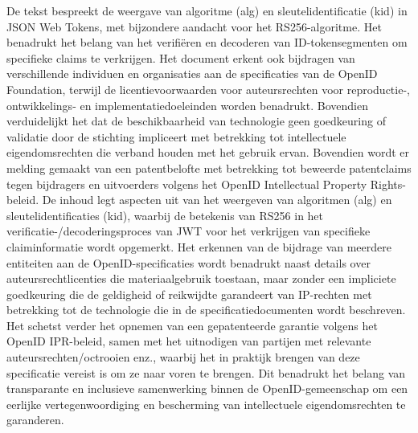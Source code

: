 \newline
De tekst bespreekt de weergave van algoritme (alg) en sleutelidentificatie (kid) in JSON Web Tokens, met bijzondere aandacht voor het RS256-algoritme. Het benadrukt het belang van het verifiëren en decoderen van ID-tokensegmenten om specifieke claims te verkrijgen. Het document erkent ook bijdragen van verschillende individuen en organisaties aan de specificaties van de OpenID Foundation, terwijl de licentievoorwaarden voor auteursrechten voor reproductie-, ontwikkelings- en implementatiedoeleinden worden benadrukt. Bovendien verduidelijkt het dat de beschikbaarheid van technologie geen goedkeuring of validatie door de stichting impliceert met betrekking tot intellectuele eigendomsrechten die verband houden met het gebruik ervan. Bovendien wordt er melding gemaakt van een patentbelofte met betrekking tot beweerde patentclaims tegen bijdragers en uitvoerders volgens het OpenID Intellectual Property Rights-beleid.
\newline
De inhoud legt aspecten uit van het weergeven van algoritmen (alg) en sleutelidentificaties (kid), waarbij de betekenis van RS256 in het verificatie-/decoderingsproces van JWT voor het verkrijgen van specifieke claiminformatie wordt opgemerkt. Het erkennen van de bijdrage van meerdere entiteiten aan de OpenID-specificaties wordt benadrukt naast details over auteursrechtlicenties die materiaalgebruik toestaan, maar zonder een impliciete goedkeuring die de geldigheid of reikwijdte garandeert van IP-rechten met betrekking tot de technologie die in de specificatiedocumenten wordt beschreven.
Het schetst verder het opnemen van een gepatenteerde garantie volgens het OpenID IPR-beleid, samen met het uitnodigen van partijen met relevante auteursrechten/octrooien enz., waarbij het in praktijk brengen van deze specificatie vereist is om ze naar voren te brengen.
Dit benadrukt het belang van transparante en inclusieve samenwerking binnen de OpenID-gemeenschap om een eerlijke vertegenwoordiging en bescherming van intellectuele eigendomsrechten te garanderen.


